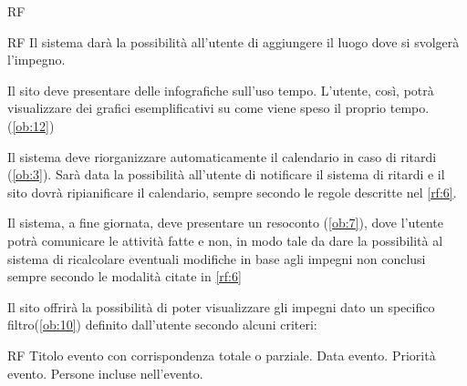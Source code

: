 \begin {listaPersonale}{RF}
\begin{listaPersonale2}{RF}
Il sistema darà la possibilità all’utente di aggiungere il luogo dove si svolgerà l’impegno.
\end{listaPersonale2}

Il sito deve presentare delle infografiche sull'uso tempo. L'utente, così, potrà
visualizzare dei grafici esemplificativi su come viene speso il proprio tempo. 
(\ref{ob:12})

Il sistema deve riorganizzare automaticamente il calendario in caso di ritardi (\ref{ob:3}). Sarà data la possibilità all'utente di notificare il sistema di ritardi e il sito dovrà ripianificare il calendario, sempre secondo le regole descritte nel \ref{rf:6}.

Il sistema, a fine giornata, deve presentare un resoconto (\ref{ob:7}), dove l'utente potrà
comunicare le attività fatte e non, in modo tale da dare la possibilità al sistema di 
ricalcolare eventuali modifiche in base agli impegni non conclusi sempre secondo le modalità citate in \ref{rf:6}

Il sito offrirà la possibilità di poter visualizzare gli impegni dato un specifico filtro(\ref{ob:10}) definito dall’utente secondo alcuni criteri: 
\begin{listaPersonale2}{RF}
 Titolo evento con corrispondenza totale o parziale.
 Data evento.
 Priorità evento.
 Persone incluse nell’evento.
\end{listaPersonale2}
\end{listaPersonale}
